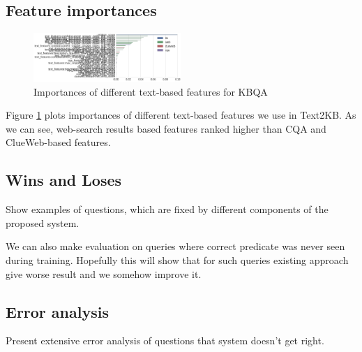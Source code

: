 \subsection{Feature importances}

\begin{figure}
\centering
\includegraphics[width=0.5\textwidth]{img/feature_importances}
\caption{Importances of different text-based features for KBQA}
\label{fig:feature_importances}
\end{figure}

Figure \ref{fig:feature_importances} plots importances of different text-based features we use in Text2KB.
As we can see, web-search results based features ranked higher than CQA and ClueWeb-based features.

\subsection{Wins and Loses}

Show examples of questions, which are fixed by different components of the proposed system.

We can also make evaluation on queries where correct predicate was never seen during training. Hopefully this will show that for such queries existing approach give worse result and we somehow improve it.

\subsection{Error analysis}

Present extensive error analysis of questions that system doesn't get right.
